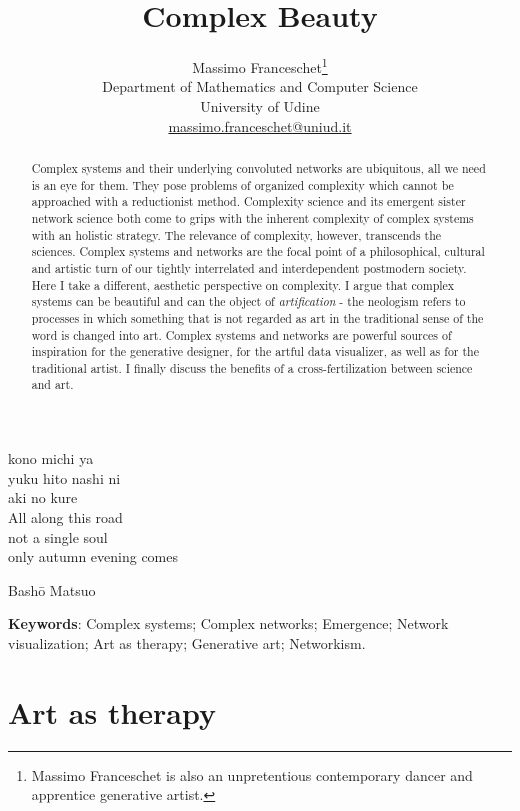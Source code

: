 \documentclass{article}
\begin{document}
\title{Complex Beauty}

\author{Massimo Franceschet\footnote{Massimo Franceschet is also an unpretentious contemporary dancer and apprentice generative artist.} \\
Department of Mathematics and Computer Science \\
University of Udine \\
\url{massimo.franceschet@uniud.it}
}
\maketitle

\epigraph{kono michi ya \\ yuku hito nashi ni \\ aki no kure \\
All along this road \\ not a single soul \\ only autumn evening comes}
{Bash\={o} Matsuo}

\begin{abstract}
Complex systems and their underlying convoluted networks are ubiquitous, all we need is an eye for them. They pose problems of organized complexity which cannot be approached with a reductionist method. Complexity science and its emergent sister network science both come to grips with the inherent complexity of complex systems with an holistic strategy. The relevance of complexity, however, transcends the sciences. Complex systems and networks are the focal point of a philosophical, cultural and artistic turn of our tightly interrelated and interdependent postmodern society. Here I take a different, aesthetic perspective on complexity. I argue that complex systems can be beautiful and can the object of \textit{artification} - the neologism refers to processes in which something that is not regarded as art in the traditional sense of the word is changed into art. Complex systems and networks are powerful sources of inspiration for the generative designer, for the artful data visualizer, as well as for the traditional artist. I finally discuss the benefits of a cross-fertilization between science and art. 
\end{abstract}

\bigskip
\noindent 
\textbf{Keywords}: Complex systems; Complex networks; Emergence; Network visualization; Art as therapy; Generative art; Networkism.  

\section{Art as therapy}
\end{document}

